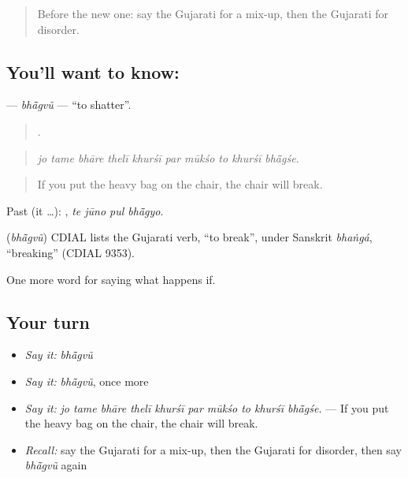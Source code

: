 \label{lesson:GU-C391-bhangvu}



\begin{quote}
Before the new one: say the Gujarati for a mix-up, then the Gujarati for disorder.
\end{quote}

\subsection*{You'll want to know: }
\textbf{} — \emph{bhā̃gvũ} — \textquotedblleft{}to shatter\textquotedblright{}.

\begin{quote}
         .
\end{quote}

\begin{quote}
\emph{jo tame bhāre thelī khurśī par mūkśo to khurśī bhā̃gśe.}
\end{quote}

\begin{quote}
If you put the heavy bag on the chair, the chair will break.
\end{quote}

Past (it …):    , \emph{te jūno pul bhā̃gyo}.

\begin{cousinweb}
\textbf{} (\emph{bhā̃gvũ}) CDIAL lists the Gujarati verb, \textquotedblleft{}to break\textquotedblright{}, under Sanskrit \emph{bhaṅgá}, \textquotedblleft{}breaking\textquotedblright{} (CDIAL 9353).
\end{cousinweb}

\begin{grammarlens}[title={What you've built}]
One more word for saying what happens if.
\end{grammarlens}

\subsection*{Your turn}
\begin{itemize}
\raggedright
  \item \emph{Say it:} \emph{bhā̃gvũ}
  \item \emph{Say it:} \emph{bhā̃gvũ}, once more
  \item \emph{Say it:} \emph{jo tame bhāre thelī khurśī par mūkśo to khurśī bhā̃gśe.} — If you put the heavy bag on the chair, the chair will break.
  \item \emph{Recall:} say the Gujarati for a mix-up, then the Gujarati for disorder, then say \emph{bhā̃gvũ} again
\end{itemize}

